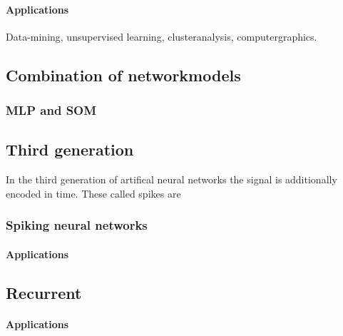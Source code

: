 \documentclass[10pt,a4paper,DIV=11]{scrreprt}
\begin{document}
\paragraph{Applications}
Data-mining, unsupervised learning, clusteranalysis, computergraphics. 

\subsection{Combination of networkmodels}

\subsubsection{MLP and SOM} %

\subsection{Third generation}
In the third generation of artifical neural networks the signal is additionally encoded in time. These called spikes are

\subsubsection{Spiking neural networks}

\paragraph{Applications}

\subsection{Recurrent}

\paragraph{Applications}

\end{document}
